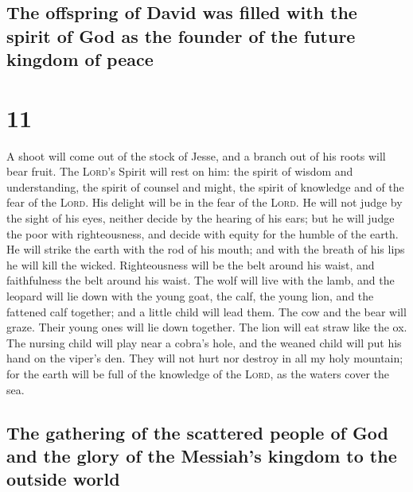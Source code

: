 \hypertarget{the-offspring-of-david-was-filled-with-the-spirit-of-god-as-the-founder-of-the-future-kingdom-of-peace}{%
\subsection{The offspring of David was filled with the spirit of God as
the founder of the future kingdom of
peace}\label{the-offspring-of-david-was-filled-with-the-spirit-of-god-as-the-founder-of-the-future-kingdom-of-peace}}

\hypertarget{section-10}{%
\section{11}\label{section-10}}

 A shoot will come out of the stock of Jesse, and a branch
out of his roots will bear fruit.  The \textsc{Lord}'s
Spirit will rest on him: the spirit of wisdom and understanding, the
spirit of counsel and might, the spirit of knowledge and of the fear of
the \textsc{Lord}.  His delight will be in the fear of the
\textsc{Lord}. He will not judge by the sight of his eyes, neither
decide by the hearing of his ears;  but he will judge the
poor with righteousness, and decide with equity for the humble of the
earth. He will strike the earth with the rod of his mouth; and with the
breath of his lips he will kill the wicked.  Righteousness
will be the belt around his waist, and faithfulness the belt around his
waist.  The wolf will live with the lamb, and the leopard
will lie down with the young goat, the calf, the young lion, and the
fattened calf together; and a little child will lead them.
 The cow and the bear will graze. Their young ones will
lie down together. The lion will eat straw like the ox. 
The nursing child will play near a cobra's hole, and the weaned child
will put his hand on the viper's den.  They will not hurt
nor destroy in all my holy mountain; for the earth will be full of the
knowledge of the \textsc{Lord}, as the waters cover the sea.

\hypertarget{the-gathering-of-the-scattered-people-of-god-and-the-glory-of-the-messiahs-kingdom-to-the-outside-world}{%
\subsection{The gathering of the scattered people of God and the glory
of the Messiah's kingdom to the outside
world}\label{the-gathering-of-the-scattered-people-of-god-and-the-glory-of-the-messiahs-kingdom-to-the-outside-world}}

